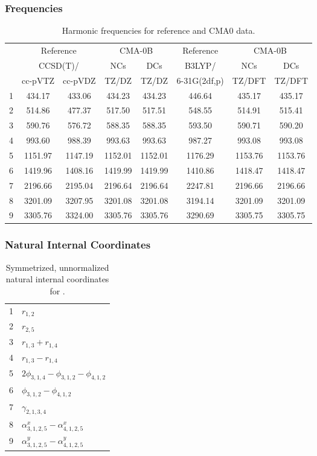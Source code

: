 \documentclass[10pt,oneside]{article}
\begin{document}
\subsubsection*{Frequencies}
\begin{table}[h!]
\centering
\caption{Harmonic frequencies for reference and CMA0 data.}
\begin{tabular}{cccccccc}
\toprule
{} & \multicolumn{2}{c}{Reference} & \multicolumn{2}{c}{CMA-0B} &    Reference & \multicolumn{2}{c}{CMA-0B} \\
{} & \multicolumn{2}{c}{CCSD(T)/} &     NCs &     DCs &       B3LYP/ &     NCs &     DCs \\
{} &   cc-pVTZ & cc-pVDZ &   TZ/DZ &   TZ/DZ & 6-31G(2df,p) &  TZ/DFT &  TZ/DFT \\
\midrule
1 &    434.17 &  433.06 &  434.23 &  434.23 &       446.64 &  435.17 &  435.17 \\
2 &    514.86 &  477.37 &  517.50 &  517.51 &       548.55 &  514.91 &  515.41 \\
3 &    590.76 &  576.72 &  588.35 &  588.35 &       593.50 &  590.71 &  590.20 \\
4 &    993.60 &  988.39 &  993.63 &  993.63 &       987.27 &  993.08 &  993.08 \\
5 &   1151.97 & 1147.19 & 1152.01 & 1152.01 &      1176.29 & 1153.76 & 1153.76 \\
6 &   1419.96 & 1408.16 & 1419.99 & 1419.99 &      1410.86 & 1418.47 & 1418.47 \\
7 &   2196.66 & 2195.04 & 2196.64 & 2196.64 &      2247.81 & 2196.66 & 2196.66 \\
8 &   3201.09 & 3207.95 & 3201.08 & 3201.08 &      3194.14 & 3201.09 & 3201.09 \\
9 &   3305.76 & 3324.00 & 3305.76 & 3305.76 &      3290.69 & 3305.75 & 3305.75 \\
\bottomrule
\end{tabular}
\end{table}

\clearpage

\subsubsection*{Natural Internal Coordinates}
\begin{table}[h!]
\centering
\caption{Symmetrized, unnormalized natural internal coordinates for .}
\small
\begin{tabular}{ll}
  1   & $r_{1,2}$ \\
  2   & $r_{2,5}$ \\
  3   & $r_{1,3} + r_{1,4}$ \\
  4   & $r_{1,3} - r_{1,4}$ \\
  5   & $2\phi_{3,1,4} - \phi_{3,1,2} - \phi_{4,1,2}$ \\
  6   & $\phi_{3,1,2} - \phi_{4,1,2}$ \\
  7   & $\gamma_{2,1,3,4}$ \\
  8   & $\alpha^x_{3,1,2,5} - \alpha^x_{4,1,2,5}$ \\
  9   & $\alpha^y_{3,1,2,5} - \alpha^y_{4,1,2,5}$ \\
\end{tabular}
\end{table}
\end{document}
